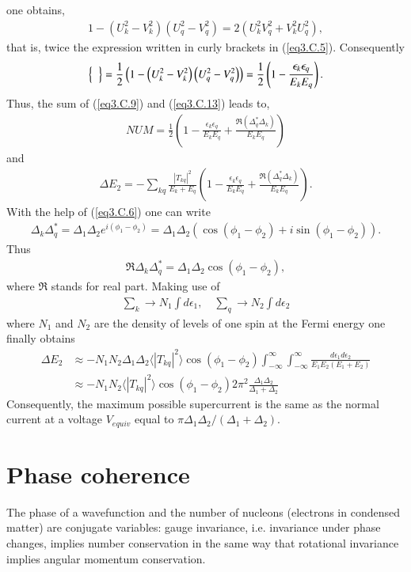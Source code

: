 one obtains,
\begin{align}
1-\left(U_k^2-V_k^2\right)\left(U_q^2-V_q^2\right)=2\left(U_k^2V_q^2+V_k^2U_q^2\right),
\end{align}
that is, twice the expression written in curly brackets in (\ref{eq3.C.5}). Consequently
\begin{align}\label{eq3.C.13}
\left\{\vphantom{\left(U_q^2-V_q^2\right)}\;\;\right\}=\frac{1}{2}\left(1-\left(U_k^2-V_k^2\right)\left(U_q^2-V_q^2\right)\right)=\frac{1}{2}\left(1-\frac{\epsilon_k\epsilon_q}{E_kE_q}\right).
\end{align}
Thus, the sum of (\ref{eq3.C.9}) and (\ref{eq3.C.13}) leads to,
\begin{align}
NUM=\frac{1}{2}\left(1-\frac{\epsilon_k\epsilon_q}{E_kE_q}+\frac{\Re(\Delta_q^*\Delta_k)}{E_kE_q}\right)
\end{align}
and
\begin{align}
\Delta E_2=-\sum_{kq}\frac{|T_{kq}|^2}{E_k+E_q}\left(1-\frac{\epsilon_k\epsilon_q}{E_kE_q}+\frac{\Re(\Delta_q^*\Delta_k)}{E_kE_q}\right).
\end{align}
With the help of (\ref{eq3.C.6}) one can write
\begin{align}
\Delta_k\Delta_q^*=\Delta_1\Delta_2e^{i(\phi_1-\phi_2)}=\Delta_1\Delta_2\left(\cos(\phi_1-\phi_2)+i\sin(\phi_1-\phi_2)\right).
\end{align}
Thus
\begin{align}
\Re\Delta_k\Delta_q^*=\Delta_1\Delta_2\cos(\phi_1-\phi_2),
\end{align}
where $\Re$ stands for real part. Making use of
\begin{align}
\sum_k\rightarrow N_1\int d\epsilon_1,\quad\sum_q\rightarrow N_2\int d\epsilon_2
\end{align}
where $N_1$ and $N_2$ are the density of levels of one spin at the Fermi energy one finally obtains
\begin{align}
\nonumber\Delta E_2&\approx-N_1N_2\Delta_1 \Delta_2 \langle|T_{kq}|^2\rangle \cos(\phi_1-\phi_2)\int_{-\infty}^{\infty}\int_{-\infty}^{\infty}\frac{d\epsilon_1 d\epsilon_2}{E_1 E_2(E_1+E_2)}\\
&\approx -N_1 N_2 \langle|T_{kq}|^2\rangle \cos(\phi_1-\phi_2) 2\pi^2\frac{\Delta_1\Delta_2}{\Delta_1+\Delta_2}
\end{align}
Consequently, the maximum possible supercurrent is the same as the normal current at a voltage $V_{equiv}$ equal to $\pi\Delta_1\Delta_2/(\Delta_1+\Delta_2)$.
\section{Phase coherence}\label{C3AppD}
The phase of a wavefunction and the number of nucleons (electrons in condensed matter) are conjugate variables: gauge invariance, i.e. invariance under phase changes, implies number conservation in the same way that rotational invariance implies angular momentum conservation.

